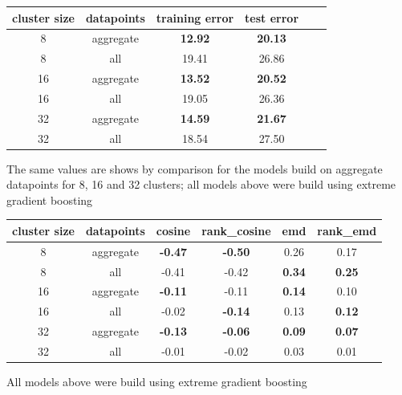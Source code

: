 \begin{table}[!ht]
	{\begin{tabular}{ | c | c | c | c | c | c | }
		\hline
		{cluster size} & datapoints & {training error} & {test error} \\ \hline
		8	&	aggregate &	\textbf{12.92}	& \textbf{20.13} \\ \hline
		8	&	all		&	19.41	&	26.86 \\ \hline \hline
		16	&	aggregate	&	\textbf{13.52}	&	\textbf{20.52} \\ \hline
		16	&	all		&	19.05	&	26.36 \\ \hline \hline
		32	&	aggregate	&	\textbf{14.59}	&	\textbf{21.67} \\ \hline
		32	&	all		&	18.54	&	27.50 \\ \hline
	\end{tabular}}
	\label{extensions:train_test_errors}
	\begin{tabnote}
		The same values are shows by comparison for the models build on aggregate datapoints for 8, 16 and 32 clusters; all models above were build using extreme gradient boosting
	\end{tabnote}
\end{table}
	
\begin{table}[!ht]
	{\begin{tabular}{ | c | c | c | c | c | c | }
		\hline
		{cluster size} & datapoints & cosine & rank\_cosine & emd & rank\_emd \\ \hline
		8	&	aggregate	&	\textbf{-0.47}	&	\textbf{-0.50}	&	0.26	&	0.17 \\ \hline
		8	&	all		&	-0.41	&	-0.42	&	\textbf{0.34}	&	\textbf{0.25} \\ \hline \hline
		16	&	aggregate	&	\textbf{-0.11}	&	-0.11	&	\textbf{0.14}	&	0.10 \\ \hline
		16	&	all		&	-0.02	&	\textbf{-0.14}	&	0.13	&	\textbf{0.12} \\ \hline \hline
		32	&	aggregate	&	\textbf{-0.13}	&	\textbf{-0.06}	&	\textbf{0.09}	&	\textbf{0.07} \\ \hline
		32	&	all		&	-0.01	&	-0.02	&	0.03	&	0.01 \\ \hline
	\end{tabular}}
	\label{extensions:correlation_values}
	\begin{tabnote}
		All models above were build using extreme gradient boosting
	\end{tabnote}
\end{table}
	
